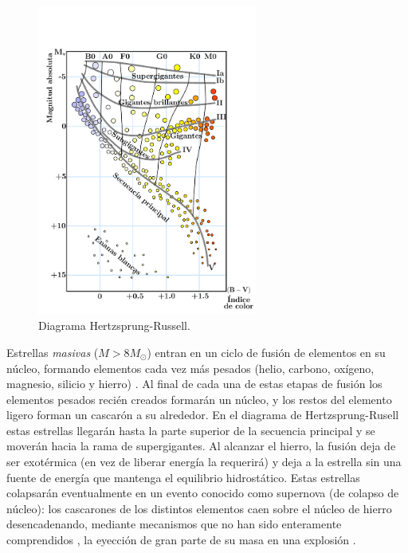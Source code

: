 \setcounter{footnote}{0}
\begin{figure}[H]
    \centering
    \includegraphics[width=205pt]{figures/H-R_diagram.pdf}%
    \caption[Diagrama Hertzsprung-Russell]{Diagrama Hertzsprung-Russell.\protect\footnotemark}
    \label{HR}
\end{figure}


Estrellas \emph{masivas} ($M>8 M_{\odot}$) entran en un ciclo de fusión de elementos en su núcleo, formando elementos cada vez más pesados (helio, carbono, oxígeno, magnesio, silicio y hierro) \cite{Glendenning2000}. Al final de cada una de estas etapas de fusión los elementos pesados recién creados formarán un núcleo, y los restos del elemento ligero forman un cascarón a su alrededor. En el diagrama de Hertzsprung-Rusell estas estrellas llegarán hasta la parte superior de la secuencia principal y se moverán hacia la rama de supergigantes. Al alcanzar el hierro, la fusión deja de ser exotérmica (en vez de liberar energía la requerirá) y deja a la estrella sin una fuente de energía que mantenga el equilibrio hidrostático. Estas estrellas colapsarán eventualmente en un evento conocido como supernova (de colapso de núcleo): los cascarones de los distintos elementos caen sobre el núcleo de hierro desencadenando, mediante mecanismos que no han sido enteramente comprendidos \cite{Janka2012}, la eyección de gran parte de su masa en una explosión \cite{Woosley2005}.

